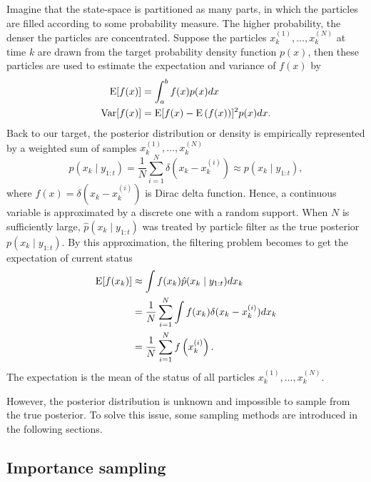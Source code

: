 Imagine that the state-space is partitioned as many parts, in which the particles are filled according to some probability measure. The higher probability, the denser the particles are concentrated. Suppose the particles $x_k^{(1)}, \ldots, x_k^{(N)}$ at time $k$ are drawn from the target probability density function $p(x)$, then these particles are used to estimate the expectation and variance of $f(x)$ by
\begin{align*}
\mathrm{E}\lbrack f(x) \rbrack &= \int_a^bf(x)p(x)dx\\
\mathrm{Var}\lbrack f(x)\rbrack &= \mathrm{E}\lbrack f(x)-\mathrm{E}\left( f(x)\right) \rbrack^2p(x)dx.
\end{align*}
Back to our target, the posterior distribution or density is empirically represented by a weighted sum of samples $x_k^{(1)}, \ldots, x_k^{(N)}$  
\begin{equation}\label{rawParticleFilter}
\hat{p}(x_k\mid y_{1:t})=\frac{1}{N}\sum_{i=1}^N\delta \left(x_k-x_k^{(i)}\right)\approx p(x_k\mid y_{1:t}),
\end{equation}
where $f(x)=\delta (x_k-x_k^{(i)})$ is Dirac delta function. Hence, a continuous variable is approximated by a discrete one with a random support. When $N$ is sufficiently large, $\hat{p}(x_k\mid y_{1:t})$ was treated by particle filter as the true posterior $p(x_k\mid y_{1:t})$. By this approximation, the filtering problem becomes to get the expectation of current status 
\begin{align*}
\mathrm{E}\lbrack f(x_k)\rbrack &\approx \int f(x_k)\hat{p}(x_k\mid y_{1:t})dx_k \\
 & =\frac{1}{N} \sum_{i=1}^N\int f(x_k) \delta (x_k-x_k^{(i)}) dx_k\\
 & = \frac{1}{N}\sum_{i=1}^Nf\left(x_k^{(i)}\right).
\end{align*}
The expectation is the mean of the status of all particles $x_k^{(1)}, \ldots, x_k^{(N)}$.  

However, the posterior distribution is unknown and impossible to sample from the true posterior. To solve this issue, some sampling methods are introduced in the following sections.


\subsection{Importance sampling}

